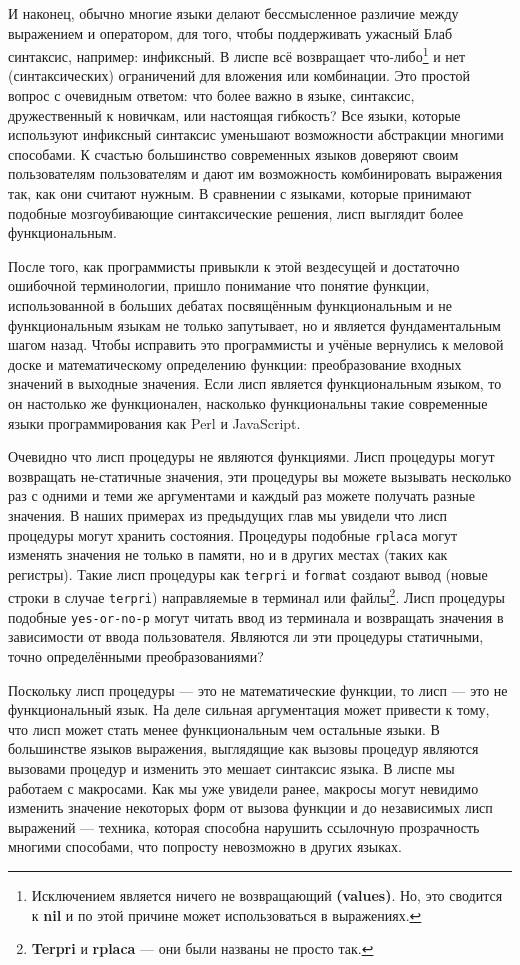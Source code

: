 И наконец, обычно многие языки делают бессмысленное различие между выражением и оператором, для того, чтобы поддерживать ужасный Блаб синтаксис, например: инфиксный. В лиспе всё возвращает что-либо\footnote{Исключением является ничего не возвращающий \textbf{(values)}. Но, это сводится к \textbf{nil} и по этой причине может использоваться в выражениях. } и нет (синтаксических) ограничений для вложения или комбинации. Это простой вопрос с очевидным ответом: что более важно в языке, синтаксис, дружественный к новичкам, или настоящая гибкость? Все языки, которые используют инфиксный синтаксис уменьшают возможности абстракции многими способами. К счастью большинство современных языков доверяют своим пользователям пользователям и дают им возможность комбинировать выражения так, как они считают нужным. В сравнении с языками, которые принимают подобные мозгоубивающие синтаксические решения, лисп выглядит более функциональным. 

После того, как программисты привыкли к этой вездесущей и достаточно ошибочной терминологии, пришло понимание что понятие функции, использованной в больших дебатах посвящённым функциональным и не функциональным языкам не только запутывает, но и является фундаментальным шагом назад. Чтобы исправить это программисты и учёные вернулись к меловой доске и математическому определению функции: преобразование входных значений в выходные значения. Если лисп является функциональным языком, то он настолько же функционален, насколько функциональны такие современные языки программирования как Perl и JavaScript. 

Очевидно что лисп процедуры не являются функциями. Лисп процедуры могут возвращать не-статичные значения, эти процедуры вы можете вызывать несколько раз с одними и теми же аргументами и каждый раз можете получать разные значения. В наших примерах из предыдущих глав мы увидели что лисп процедуры могут хранить состояния. Процедуры подобные \verb"rplaca" могут изменять значения не только в памяти, но и в других местах (таких как регистры). Такие лисп процедуры как \verb"terpri" и \verb"format" создают вывод (новые строки в случае \verb"terpri") направляемые в терминал или файлы\footnote{\textbf{Terpri} и \textbf{rplaca} --- они были названы не просто так.}. Лисп процедуры подобные \verb"yes-or-no-p" могут читать ввод из терминала и возвращать значения в зависимости от ввода пользователя. Являются ли эти процедуры статичными, точно определёнными преобразованиями? 

Поскольку лисп процедуры --- это не математические функции, то лисп --- это не функциональный язык. На деле сильная аргументация может привести к тому, что лисп может стать менее функциональным чем остальные языки. В большинстве языков выражения, выглядящие как вызовы процедур являются вызовами процедур и изменить это мешает синтаксис языка. В лиспе мы работаем с макросами. Как мы уже увидели ранее, макросы могут невидимо изменить значение некоторых форм от вызова функции и до независимых лисп выражений --- техника, которая способна нарушить ссылочную прозрачность многими способами, что попросту невозможно в других языках.

